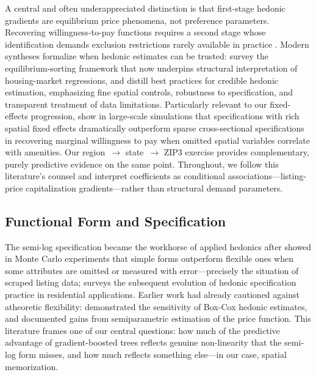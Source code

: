 A central and often underappreciated distinction is that first-stage hedonic
gradients are equilibrium price phenomena, not preference parameters. Recovering
willingness-to-pay functions requires a second stage whose identification demands
exclusion restrictions rarely available in practice \citep{bartik1987estimation,
ekeland2004identification}. Modern syntheses formalize when hedonic estimates can
be trusted: \citet{kuminoff2013new} survey the equilibrium-sorting framework that
now underpins structural interpretation of housing-market regressions, and
\citet{bishop2020best} distill best practices for credible hedonic estimation,
emphasizing fine spatial controls, robustness to specification, and transparent
treatment of data limitations. Particularly relevant to our fixed-effects
progression, \citet{kuminoff2010which} show in large-scale simulations that
specifications with rich spatial fixed effects dramatically outperform sparse
cross-sectional specifications in recovering marginal willingness to pay when
omitted spatial variables correlate with amenities. Our region~$\rightarrow$
state~$\rightarrow$ ZIP3 exercise provides complementary, purely predictive
evidence on the same point. Throughout, we follow this literature's counsel and
interpret coefficients as conditional associations---listing-price capitalization
gradients---rather than structural demand parameters.

\subsection{Functional Form and Specification}

The semi-log specification became the workhorse of applied hedonics after
\citet{cropper1988choice} showed in Monte Carlo experiments that simple forms
outperform flexible ones when some attributes are omitted or measured with
error---precisely the situation of scraped listing data; \citet{hill2013hedonic}
surveys the subsequent evolution of hedonic specification practice in residential
applications. Earlier work had already
cautioned against atheoretic flexibility: \citet{halvorsen1981choice} demonstrated
the sensitivity of Box-Cox hedonic estimates, and \citet{anglin1996semiparametric}
documented gains from semiparametric estimation of the price function. This
literature frames one of our central questions: how much of the predictive
advantage of gradient-boosted trees reflects genuine non-linearity that the
semi-log form misses, and how much reflects something else---in our case, spatial
memorization.

